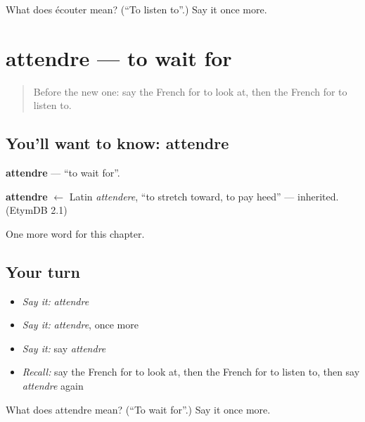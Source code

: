 \begin{tcolorbox}[breakable,colback=teal!4,colframe=teal!35!black,title={Before you move on}]
What does écouter mean? (\textquotedblleft{}To listen to\textquotedblright{}.) Say it once more.
\end{tcolorbox}
\section[attendre]{attendre — to wait for}

\label{lesson:FR-C64-attendre}



\begin{quote}
Before the new one: say the French for to look at, then the French for to listen to.
\end{quote}

\subsection*{You'll want to know: attendre}
\textbf{attendre} — \textquotedblleft{}to wait for\textquotedblright{}.

\begin{cousinweb}
\textbf{attendre} $\leftarrow$ Latin \emph{attendere}, \textquotedblleft{}to stretch toward, to pay heed\textquotedblright{} — inherited. (EtymDB 2.1)
\end{cousinweb}

\begin{grammarlens}[title={What you've built}]
One more word for this chapter.
\end{grammarlens}

\subsection*{Your turn}
\begin{itemize}
\raggedright
  \item \emph{Say it:} \emph{attendre}
  \item \emph{Say it:} \emph{attendre}, once more
  \item \emph{Say it:} say \emph{attendre}
  \item \emph{Recall:} say the French for to look at, then the French for to listen to, then say \emph{attendre} again
\end{itemize}

\begin{tcolorbox}[breakable,colback=teal!4,colframe=teal!35!black,title={Before you move on}]
What does attendre mean? (\textquotedblleft{}To wait for\textquotedblright{}.) Say it once more.
\end{tcolorbox}
